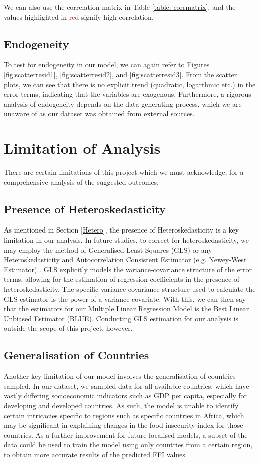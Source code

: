 \documentclass{article}
\begin{document}
\noindent We can also use the correlation matrix in Table \ref{table: corrmatrix}, and the values highlighted in \textcolor{red}{red} signify high correlation.


\subsection{Endogeneity}
To test for endogeneity in our model, we can again refer to Figures \ref{fig:scatterresid1}, \ref{fig:scatterresid2}, and \ref{fig:scatterresid3}. From the scatter plots, we can see that there is no explicit trend (quadratic, logarthmic etc.) in the error terms, indicating that the variables are exogenous. Furthermore, a rigorous analysis of endogeneity depends on the data generating process, which we are unaware of as our dataset was obtained from external sources. 

\section{Limitation of Analysis}\label{limitations}
There are certain limitations of this project which we must acknowledge, for a comprehensive analysis of the suggested outcomes. 

\subsection{Presence of Heteroskedasticity}
As mentioned in Section \ref{Hetero}, the presence of Heteroskedasticity is a key limitation in our analysis. In future studies, to correct for heteroskedasticity, we may employ the method of Generalised Least Squares (GLS) \cite{GLS} or any Heteroskedasticity and Autocorrelation Consistent Estimator (e.g. Newey-West Estimator) \cite{HACestimator}. GLS explicitly models the variance-covariance structure of the error terms, allowing for the estimation of regression coefficients in the presence of heteroskedasticity. The specific variance-covariance structure used to calculate the GLS estimator is the power of a variance covariate. With this, we can then say that the estimators for our Multiple Linear Regression Model is the Best Linear Unbiased Estimator (BLUE). Conducting GLS estimation for our analysis is outside the scope of this project, however.

\subsection{Generalisation of Countries}
Another key limitation of our model involves the generalisation of countries sampled. In our dataset, we sampled data for all available countries, which have vastly differing socioeconomic indicators such as GDP per capita, especially for developing and developed countries. As such, the model is unable to identify certain intricacies specific to regions such as specific countries in Africa, which may be significant in explaining changes in the food insecurity index for those countries. As a further improvement for future localised models, a subset of the data could be used to train the model using only countries from a certain region, to obtain more accurate results of the predicted FFI values.
\end{document}
